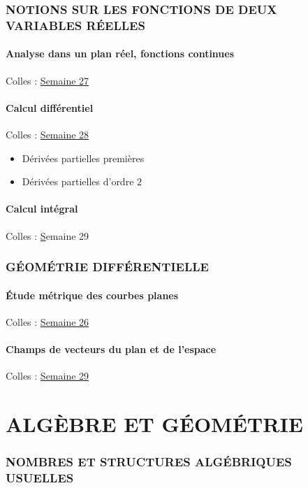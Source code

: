 \section{NOTIONS SUR LES FONCTIONS DE DEUX VARIABLES
R\'EELLES}

\subsection{Analyse dans un plan r{\'e}el, fonctions continues}
Colles : \href{S27.pdf}{Semaine 27}

\subsection{Calcul diff\'erentiel}
Colles : \href{S28.pdf}{Semaine 28}
\begin{itemize}
\item D\'eriv\'ees partielles premi\`eres
\item D\'eriv\'ees partielles d'ordre $2$
\end{itemize}

\subsection{Calcul int\'egral}
Colles : \href{S29.pdf}Semaine 29


\section{G\'EOM\'ETRIE DIFF\'ERENTIELLE}

\subsection{\'Etude m{\'e}trique des courbes planes}
Colles : \href{S26.pdf}{Semaine 26}

\subsection{Champs de vecteurs du plan et de l'espace}
Colles : \href{S29.pdf}{Semaine 29}

\vfill\eject

\part{ALG\`EBRE ET G\'EOM\'ETRIE}

\section{NOMBRES ET STRUCTURES ALG\'EBRIQUES USUELLES}


